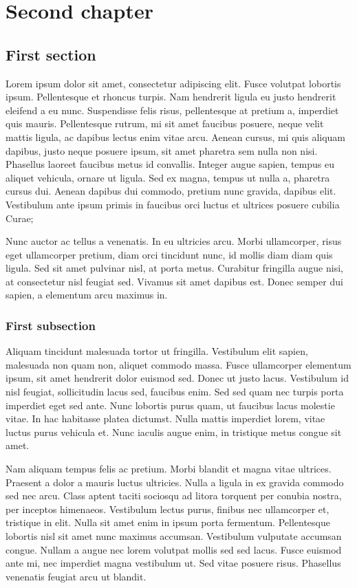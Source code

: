 \chapter{Second chapter}

\section{First section}
Lorem ipsum dolor sit amet, consectetur adipiscing elit. Fusce volutpat lobortis ipsum. Pellentesque et rhoncus turpis. Nam hendrerit ligula eu justo hendrerit eleifend a eu nunc. Suspendisse felis risus, pellentesque at pretium a, imperdiet quis mauris. Pellentesque rutrum, mi sit amet faucibus posuere, neque velit mattis ligula, ac dapibus lectus enim vitae arcu. Aenean cursus, mi quis aliquam dapibus, justo neque posuere ipsum, sit amet pharetra sem nulla non nisi. Phasellus laoreet faucibus metus id convallis. Integer augue sapien, tempus eu aliquet vehicula, ornare ut ligula. Sed ex magna, tempus ut nulla a, pharetra cursus dui. Aenean dapibus dui commodo, pretium nunc gravida, dapibus elit. Vestibulum ante ipsum primis in faucibus orci luctus et ultrices posuere cubilia Curae;

Nunc auctor ac tellus a venenatis. In eu ultricies arcu. Morbi ullamcorper, risus eget ullamcorper pretium, diam orci tincidunt nunc, id mollis diam diam quis ligula. Sed sit amet pulvinar nisl, at porta metus. Curabitur fringilla augue nisi, at consectetur nisl feugiat sed. Vivamus sit amet dapibus est. Donec semper dui sapien, a elementum arcu maximus in.

\subsection{First subsection}
Aliquam tincidunt malesuada tortor ut fringilla. Vestibulum elit sapien, malesuada non quam non, aliquet commodo massa. Fusce ullamcorper elementum ipsum, sit amet hendrerit dolor euismod sed. Donec ut justo lacus. Vestibulum id nisl feugiat, sollicitudin lacus sed, faucibus enim. Sed sed quam nec turpis porta imperdiet eget sed ante. Nunc lobortis purus quam, ut faucibus lacus molestie vitae. In hac habitasse platea dictumst. Nulla mattis imperdiet lorem, vitae luctus purus vehicula et. Nunc iaculis augue enim, in tristique metus congue sit amet.

Nam aliquam tempus felis ac pretium. Morbi blandit et magna vitae ultrices. Praesent a dolor a mauris luctus ultricies. Nulla a ligula in ex gravida commodo sed nec arcu. Class aptent taciti sociosqu ad litora torquent per conubia nostra, per inceptos himenaeos. Vestibulum lectus purus, finibus nec ullamcorper et, tristique in elit. Nulla sit amet enim in ipsum porta fermentum. Pellentesque lobortis nisl sit amet nunc maximus accumsan. Vestibulum vulputate accumsan congue. Nullam a augue nec lorem volutpat mollis sed sed lacus. Fusce euismod ante mi, nec imperdiet magna vestibulum ut. Sed vitae posuere risus. Phasellus venenatis feugiat arcu ut blandit.

